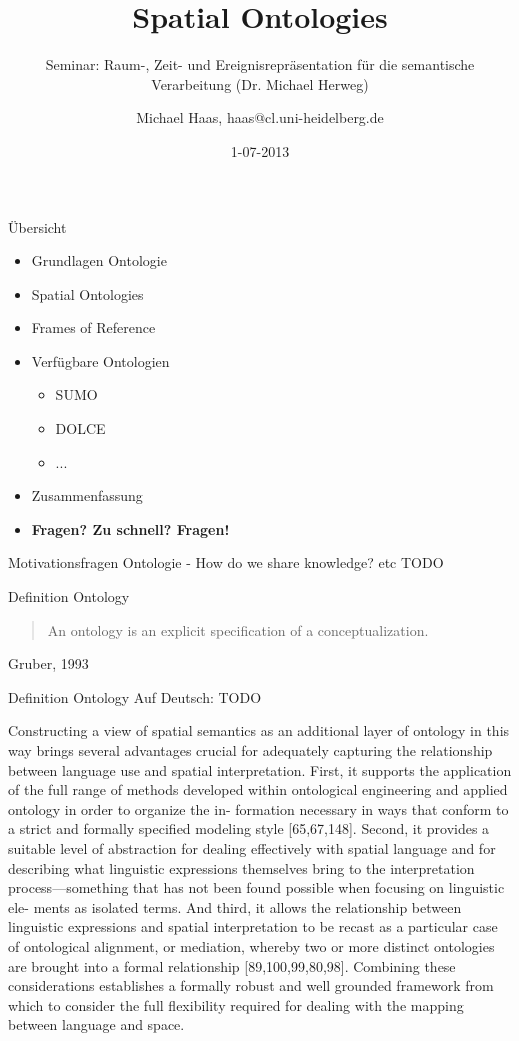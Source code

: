 \documentclass[12pt,a4paper]{beamer}
\author{Michael Haas, haas@cl.uni-heidelberg.de}
\title{Spatial Ontologies}
\subtitle{Seminar: Raum-, Zeit- und Ereignisrepräsentation für die semantische Verarbeitung (Dr. Michael Herweg)}
\date{1-07-2013}
\begin{document}
\begin{frame}
\maketitle
\end{frame}

\begin{frame}{Übersicht}
\begin{itemize}
\item Grundlagen Ontologie
\item Spatial Ontologies
\item Frames of Reference
\item Verfügbare Ontologien
\begin{itemize}
    \item SUMO
    \item DOLCE
    \item ...
\end{itemize}
\item Zusammenfassung 
\item \textbf{Fragen? Zu schnell? Fragen!}
\end{itemize}
\end{frame}


\begin{frame}{Motivationsfragen Ontologie}
 - How do we share knowledge? etc TODO
\end{frame}





\begin{frame}{Definition Ontology}
\begin{quote}
An ontology is an explicit specification of a conceptualization.
\end{quote}
Gruber, 1993
\end{frame}

\begin{frame}{Definition Ontology}
Auf Deutsch: TODO
\end{frame}


Constructing a view of spatial semantics as an additional layer of ontology in this way brings several advantages crucial
for adequately capturing the relationship between language use and spatial interpretation. First, it supports the application
of the full range of methods developed within ontological engineering and applied ontology in order to organize the in-
formation necessary in ways that conform to a strict and formally specified modeling style [65,67,148]. Second, it provides
a suitable level of abstraction for dealing effectively with spatial language and for describing what linguistic expressions
themselves bring to the interpretation process—something that has not been found possible when focusing on linguistic ele-
ments as isolated terms. And third, it allows the relationship between linguistic expressions and spatial interpretation to be
recast as a particular case of ontological alignment, or mediation, whereby two or more distinct ontologies are brought into
a formal relationship [89,100,99,80,98]. Combining these considerations establishes a formally robust and well grounded
framework from which to consider the full flexibility required for dealing with the mapping between language and space.
\end{document}
